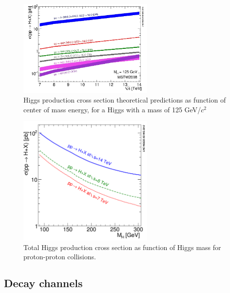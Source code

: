 \begin{figure}[!Hhtbp]
  \begin{center}
    \includegraphics[width=0.6\textwidth]{figs/7-14_Higgs_xsec.jpg}
    \caption{Higgs production cross section theoretical predictions as function of center of mass energy, for a Higgs with a mass of 125 GeV/$c^{2}$}
    \label{fig:HiggsProdXS}
  \end{center}
\end{figure}

\begin{figure}[!Hhtbp]
  \begin{center}
    \includegraphics[width=0.6\textwidth]{figs/totalXS_LM.png}
    \caption{Total Higgs production cross section as function of Higgs mass for proton-proton collisions.}
    \label{fig:TotalHiggsXS}
  \end{center}
\end{figure}


\subsection{Decay channels}

